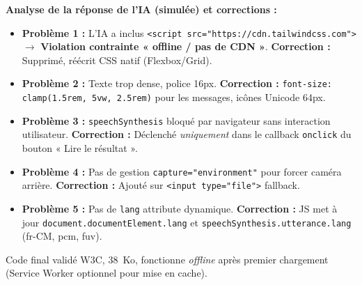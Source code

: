 \documentclass[11pt]{article}
\begin{document}
\begin{exoresolu}
\textbf{Analyse de la réponse de l'IA (simulée) et corrections :}
\begin{itemize}
    \item \textbf{Problème 1 :} L'IA a inclus \texttt{<script src="https://cdn.tailwindcss.com">} $\rightarrow$ \textbf{Violation contrainte « offline / pas de CDN »}. \textbf{Correction :} Supprimé, réécrit CSS natif (Flexbox/Grid).
    \item \textbf{Problème 2 :} Texte trop dense, police 16px. \textbf{Correction :} \texttt{font-size: clamp(1.5rem, 5vw, 2.5rem)} pour les messages, icônes Unicode 64px.
    \item \textbf{Problème 3 :} \texttt{speechSynthesis} bloqué par navigateur sans interaction utilisateur. \textbf{Correction :} Déclenché \emph{uniquement} dans le callback \texttt{onclick} du bouton « Lire le résultat ».
    \item \textbf{Problème 4 :} Pas de gestion \texttt{capture="environment"} pour forcer caméra arrière. \textbf{Correction :} Ajouté sur \texttt{<input type="file">} fallback.
    \item \textbf{Problème 5 :} Pas de \texttt{lang} attribute dynamique. \textbf{Correction :} JS met à jour \texttt{document.documentElement.lang} et \texttt{speechSynthesis.utterance.lang} (fr-CM, pcm, fuv).
\end{itemize}
Code final validé W3C, \SI{38}{Ko}, fonctionne \emph{offline} après premier chargement (Service Worker optionnel pour mise en cache).


\end{exoresolu}
\end{document}
